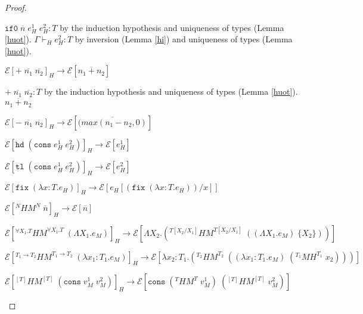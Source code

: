 \begin{theorem}
\begin{proof}
\begin{case}
$\mathtt{if0}\;\overline{n}\;e_{H}^{1}\;e_{H}^{2}:T$ by the induction hypothesis and uniqueness of types (Lemma \ref{huot}).  $\Gamma\vdash_{H}e_{H}^{2}:T$ by inversion (Lemma \ref{hi}) and uniqueness of types (Lemma \ref{huot}).
\end{case}
\begin{case}
$\mathscr{E}[+\;\overline{n_{1}}\;\overline{n_{2}}]_{H}\rightarrow\mathscr{E}[\overline{n_{1}+n_{2}}]$

$+\;\overline{n_{1}}\;\overline{n_{2}}:T$ by the induction hypothesis and uniqueness of types (Lemma \ref{huot}).  $\overline{n_{1}+n_{2}}$
\end{case}
\begin{case}
$\mathscr{E}[-\;\overline{n_{1}}\;\overline{n_{2}}]_{H}\rightarrow\mathscr{E}[\overline{(max(n_{1}-n_{2},0)}]$

\end{case}
\begin{case}
$\mathscr{E}[\mathtt{hd}\;(\mathtt{cons}\;e_{H}^{1}\;e_{H}^{2})]_{H}\rightarrow\mathscr{E}[e_{H}^{1}]$

\end{case}
\begin{case}
$\mathscr{E}[\mathtt{tl}\;(\mathtt{cons}\;e_{H}^{1}\;e_{H}^{2})]_{H}\rightarrow\mathscr{E}[e_{H}^{2}]$

\end{case}
\begin{case}
$\mathscr{E}[\mathtt{fix}\;(\lambda x:T.e_{H})]_{H}\rightarrow\mathscr{E}[e_{H}[(\mathtt{fix}\;(\lambda x:T.e_{H}))/x]]$

\end{case}
\begin{case}
$\mathscr{E}[^{N}HM^{N}\;\overline{n}]_{H}\rightarrow\mathscr{E}[\overline{n}]$

\end{case}
\begin{case}
$\mathscr{E}[^{\forall X_{1}.T}HM^{\forall X_{1}.T}\;(\Lambda X_{1}.e_{M})]_{H}\rightarrow\mathscr{E}[\Lambda X_{2}.(^{T[X_{2}/X_{1}]}HM^{T[X_{2}/X_{1}]}\;((\Lambda X_{1}.e_{M})\;\lbrace X_{2}\rbrace))]$


\end{case}
\begin{case}
$\mathscr{E}[^{T_{1}\rightarrow T_{2}}HM^{T_{1}\rightarrow T_{2}}\;(\lambda x_{1}:T_{1}.e_{M})]_{H}\rightarrow\mathscr{E}[\lambda x_{2}:T_{1}.(^{T_{2}}HM^{T_{2}}\;((\lambda x_{1}:T_{1}.e_{M})\;(^{T_{1}}MH^{T_{1}}\;x_{2})))]$

\end{case}
\begin{case}
$\mathscr{E}[^{[T]}HM^{[T]}\;(\mathtt{cons}\;v_{M}^{1}\;v_{M}^{2})]_{H}\rightarrow\mathscr{E}[\mathtt{cons}\;(^{T}HM^{T}\;v_{M}^{1})\;(^{[T]}HM^{[T]}\;v_{M}^{2})]$


\end{case}
\end{proof}
\end{theorem}
